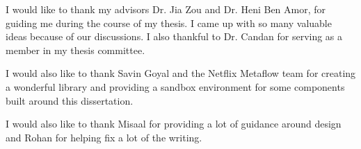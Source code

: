 I would like to thank my advisors Dr. Jia Zou and Dr. Heni Ben Amor, for guiding me during the course of my thesis. I came up with so many valuable ideas because of our discussions. I also thankful to Dr. Candan for serving as a member in my thesis committee. 

I would also like to thank Savin Goyal and the Netflix Metaflow team for creating a wonderful library and providing a sandbox environment for some components built around this dissertation. 

I would also like to thank Misaal for providing a lot of guidance around design and Rohan for helping fix a lot of the writing. 